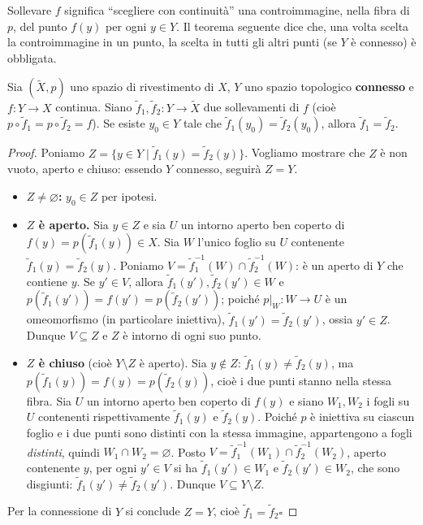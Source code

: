 \begin{intuizione}
Sollevare $f$ significa ``scegliere con continuit\`a'' una controimmagine, nella fibra di $p$, del punto $f(y)$ per ogni $y \in Y$. Il teorema seguente dice che, una volta scelta la controimmagine in un punto, la scelta in tutti gli altri punti (se $Y$ \`e connesso) \`e obbligata.
\end{intuizione}

\begin{teo}
Sia $(\widetilde{X}, p)$ uno spazio di rivestimento di $X$, $Y$ uno spazio topologico \textbf{connesso} e $f: Y \to X$ continua. Siano $\widetilde{f}_1, \widetilde{f}_2: Y \to \widetilde{X}$ due sollevamenti di $f$ (cio\`e $p \circ \widetilde{f}_1 = p \circ \widetilde{f}_2 = f$). Se esiste $y_0 \in Y$ tale che $\widetilde{f}_1(y_0) = \widetilde{f}_2(y_0)$, allora $\widetilde{f}_1 = \widetilde{f}_2$.
\end{teo}

\begin{proof}
Poniamo $Z = \{ y \in Y \mid \widetilde{f}_1(y) = \widetilde{f}_2(y) \}$. Vogliamo mostrare che $Z$ \`e non vuoto, aperto e chiuso: essendo $Y$ connesso, seguir\`a $Z = Y$.

\begin{itemize}
    \item \textbf{$Z \neq \varnothing$:} $y_0 \in Z$ per ipotesi.
    \item \textbf{$Z$ \`e aperto.} Sia $y \in Z$ e sia $U$ un intorno aperto ben coperto di $f(y) = p(\widetilde{f}_1(y)) \in X$. Sia $W$ l'unico foglio su $U$ contenente $\widetilde{f}_1(y) = \widetilde{f}_2(y)$. Poniamo $V = \widetilde{f}_1^{-1}(W) \cap \widetilde{f}_2^{-1}(W)$: \`e un aperto di $Y$ che contiene $y$. Se $y' \in V$, allora $\widetilde{f}_1(y'), \widetilde{f}_2(y') \in W$ e $p(\widetilde{f}_1(y')) = f(y') = p(\widetilde{f}_2(y'))$; poich\'e $p|_W: W \to U$ \`e un omeomorfismo (in particolare iniettiva), $\widetilde{f}_1(y') = \widetilde{f}_2(y')$, ossia $y' \in Z$. Dunque $V \subseteq Z$ e $Z$ \`e intorno di ogni suo punto.
    \item \textbf{$Z$ \`e chiuso} (cio\`e $Y \setminus Z$ \`e aperto). Sia $y \notin Z$: $\widetilde{f}_1(y) \neq \widetilde{f}_2(y)$, ma $p(\widetilde{f}_1(y)) = f(y) = p(\widetilde{f}_2(y))$, cio\`e i due punti stanno nella stessa fibra. Sia $U$ un intorno aperto ben coperto di $f(y)$ e siano $W_1, W_2$ i fogli su $U$ contenenti rispettivamente $\widetilde{f}_1(y)$ e $\widetilde{f}_2(y)$. Poich\'e $p$ \`e iniettiva su ciascun foglio e i due punti sono distinti con la stessa immagine, appartengono a fogli \emph{distinti}, quindi $W_1 \cap W_2 = \varnothing$. Posto $V = \widetilde{f}_1^{-1}(W_1) \cap \widetilde{f}_2^{-1}(W_2)$, aperto contenente $y$, per ogni $y' \in V$ si ha $\widetilde{f}_1(y') \in W_1$ e $\widetilde{f}_2(y') \in W_2$, che sono disgiunti: $\widetilde{f}_1(y') \neq \widetilde{f}_2(y')$. Dunque $V \subseteq Y \setminus Z$.
\end{itemize}
Per la connessione di $Y$ si conclude $Z = Y$, cio\`e $\widetilde{f}_1 = \widetilde{f}_2$\hfill$\square$
\end{proof}

